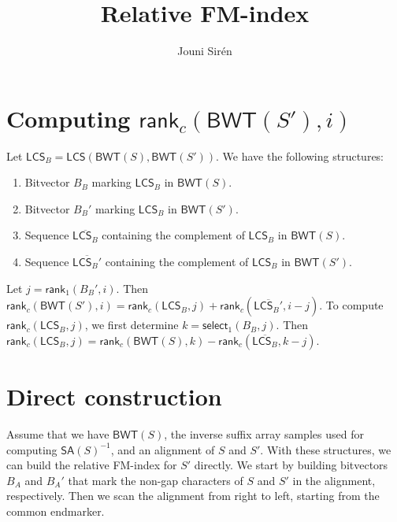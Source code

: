 \documentclass[11pt,a4paper]{article}
\newcommand{\BWT}
  {\ensuremath{\mathsf{BWT}}}
\newcommand{\SA}
  {\ensuremath{\mathsf{SA}}}
\newcommand{\LCS}
  {\ensuremath{\mathsf{LCS}}}
\newcommand{\mrank}{\ensuremath{\mathsf{rank}}}
\newcommand{\mselect}{\ensuremath{\mathsf{select}}}
\begin{document}
\title{Relative FM-index}
\author{Jouni Sirén}
\maketitle

\section*{Computing $\mrank_{c}(\BWT(S'), i)$}

Let $\LCS_{B} = \LCS(\BWT(S), \BWT(S'))$. We have the following structures:
\begin{enumerate}
\item Bitvector $B_{B}$ marking $\LCS_{B}$ in $\BWT(S)$.
\item Bitvector $B_{B}'$ marking $\LCS_{B}$ in $\BWT(S')$.
\item Sequence $\overline{\LCS_{B}}$ containing the complement of $\LCS_{B}$ in $\BWT(S)$.
\item Sequence $\overline{\LCS_{B}'}$ containing the complement of $\LCS_{B}$ in $\BWT(S')$.
\end{enumerate}

Let $j = \mrank_{1}(B_{B}', i)$. Then $\mrank_{c}(\BWT(S'), i) = \mrank_{c}(\LCS_{B}, j) + \mrank_{c}(\overline{\LCS_{B}'}, i-j).$ To compute $\mrank_{c}(\LCS_{B}, j)$, we first determine $k = \mselect_{1}(B_{B}, j)$. Then $\mrank_{c}(\LCS_{B}, j) = \mrank_{c}(\BWT(S), k) - \mrank_{c}(\overline{\LCS_{B}}, k-j)$.



\section*{Direct construction}

Assume that we have $\BWT(S)$, the inverse suffix array samples used for computing $\SA(S)^{-1}$, and an alignment of $S$ and $S'$. With these structures, we can build the relative FM-index for $S'$ directly. We start by building bitvectors $B_{A}$ and $B_{A}'$ that mark the non-gap characters of $S$ and $S'$ in the alignment, respectively. Then we scan the alignment from right to left, starting from the common endmarker.
\end{document}
